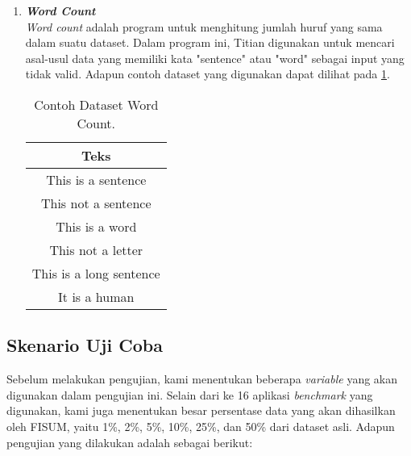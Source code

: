 \begin{enumerate}
      \ 

      \item \emph{\textbf{Word Count}} \\
            \emph{Word count} adalah program untuk menghitung jumlah huruf yang sama dalam suatu dataset. Dalam program ini, Titian digunakan untuk mencari asal-usul data yang memiliki kata "sentence" atau "word" sebagai input yang tidak valid.
            Adapun contoh dataset yang digunakan dapat 
            dilihat pada \ref{tb:wordcountdataset}.

            \begin{longtable}{|c|}
                  \caption{Contoh Dataset Word Count.}
                  \label{tb:wordcountdataset} \\
                  \hline
                  \rowcolor[HTML]{C0C0C0}
                  \textbf{Teks} \\
                  \hline
                  This is a sentence \\
                  This not a sentence \\
                  This is a word \\
                  This not a letter \\
                  This is a long sentence \\
                  It is a human \\
                  \hline
            \end{longtable}

\end{enumerate}


\subsection{Skenario Uji Coba}
\label{subsec:skenarioujicoba}

Sebelum melakukan pengujian, kami menentukan beberapa 
\emph{variable} yang akan digunakan dalam pengujian ini.
Selain dari ke 16 aplikasi \emph{benchmark} yang digunakan,
kami juga menentukan besar persentase data yang akan
dihasilkan oleh FISUM, yaitu 1\%, 2\%, 5\%, 10\%, 25\%, dan
50\% dari dataset asli. Adapun pengujian yang dilakukan
adalah sebagai berikut:

